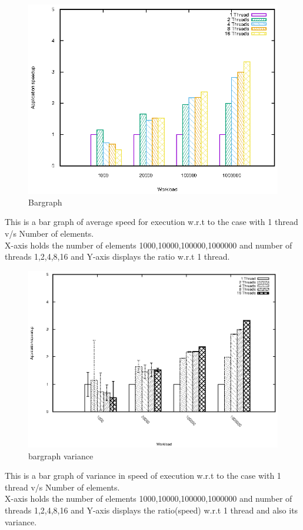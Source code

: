 \documentclass{article}
\begin{document}
\clearpage

\begin{figure}
\includegraphics[width=\linewidth]{speedup_color.eps}
\caption{Bargraph}
\label{fig:Scatter graph}
\end{figure}
\noindent
This is a bar graph of average speed for execution w.r.t to the case with 1 thread v/s Number of elements. \\
X-axis holds the number of elements {1000,10000,100000,1000000} and number of threads {1,2,4,8,16} and Y-axis displays the ratio w.r.t 1 thread.

\clearpage

\begin{figure}
\includegraphics[width=\linewidth]{speedup_errorbar.eps}
\caption{bargraph variance}
\label{fig:Scatter graph}
\end{figure}
\noindent
This is a bar graph of variance in speed of execution w.r.t to the case with 1 thread v/s Number of elements. \\
X-axis holds the number of elements {1000,10000,100000,1000000} and number of threads {1,2,4,8,16} and Y-axis displays the ratio(speed) w.r.t 1 thread and also its variance.
\end{document}
